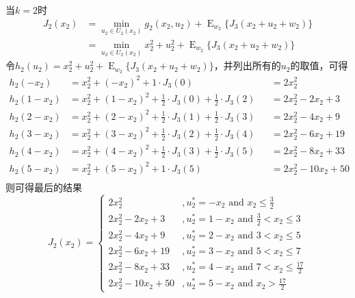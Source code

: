 \documentclass{article}
\begin{document}
\begin{enumerate}[(c)]
        当$k=2$时
        \begin{equation}
            \begin{split}
                J_2(x_2)&=\min_{u_2\in U_2(x_2)}g_2(x_2,u_2)+\mathop{E}_{w_2}\big\{J_3(x_2+u_2+w_2)\big\}\\
                &=\min_{u_2\in U_2(x_2)}x_2^2+u_2^2+\mathop{E}_{w_2}\big\{J_3(x_2+u_2+w_2)\big\}
            \end{split}
        \end{equation}
        令$h_2(u_2)=x_2^2+u_2^2+\mathop{E}_{w_2}\big\{J_3(x_2+u_2+w_2)\big\}$，并列出所有的$u_2$的取值，可得
        \begin{equation}
            \begin{aligned}
                h_2(-x_2)&=x_2^2+(-x_2)^2+1\cdot J_3(0)&&=2x_2^2\\
                h_2(1-x_2)&=x_2^2+(1-x_2)^2+\frac{1}{2}\cdot J_3(0)+\frac{1}{2}\cdot J_3(2)&&=2x_2^2-2x_2+3\\
                h_2(2-x_2)&=x_2^2+(2-x_2)^2+\frac{1}{2}\cdot J_3(1)+\frac{1}{2}\cdot J_3(3)&&=2x_2^2-4x_2+9\\
                h_2(3-x_2)&=x_2^2+(3-x_2)^2+\frac{1}{2}\cdot J_3(2)+\frac{1}{2}\cdot J_3(4)&&=2x_2^2-6x_2+19\\
                h_2(4-x_2)&=x_2^2+(4-x_2)^2+\frac{1}{2}\cdot J_3(3)+\frac{1}{2}\cdot J_3(5)&&=2x_2^2-8x_2+33\\
                h_2(5-x_2)&=x_2^2+(5-x_2)^2+1\cdot J_3(5)&&=2x_2^2-10x_2+50\\
            \end{aligned}
        \end{equation}
        则可得最后的结果
        \begin{equation}
            J_2(x_2)=
            \begin{cases}
                2x_2^2 &, u_2^*=-x_2\text{ and }x_2\leq\frac{3}{2}\\
                2x_2^2-2x_2+3 &, u_2^*=1-x_2\text{ and }\frac{3}{2}<x_2\leq 3\\
                2x_2^2-4x_2+9 &, u_2^*=2-x_2\text{ and }3<x_2\leq 5\\
                2x_2^2-6x_2+19 &, u_2^*=3-x_2\text{ and }5<x_2\leq 7\\
                2x_2^2-8x_2+33 &, u_2^*=4-x_2\text{ and }7<x_2\leq\frac{17}{2}\\
                2x_2^2-10x_2+50 &,u_2^*=5-x_2\text{ and }x_2>\frac{17}{2}
            \end{cases}
        \end{equation}


\end{enumerate}
\end{document}
